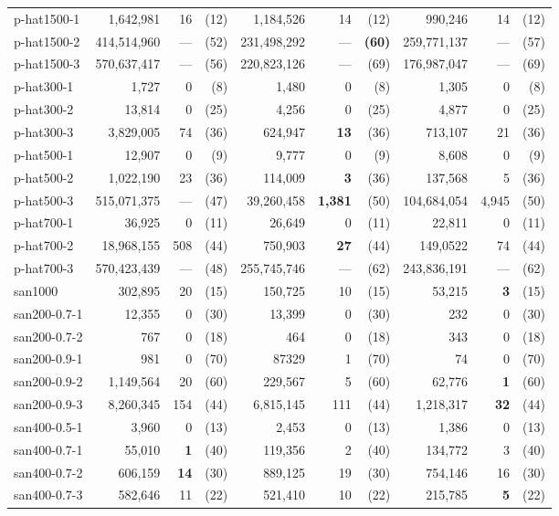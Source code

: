 \documentclass{l4proj}
\begin{document}
\begin{table}
\begin{center}
\begin{scriptsize}
\begin{tabular}{|l|r r r|r r r|r r r|}
p-hat1500-1 & 1,642,981 & 16 & (12) & 1,184,526 & 14 & (12) & 990,246 & 14 & (12) \\ 
p-hat1500-2 & 414,514,960 & --- & (52) & 231,498,292 & --- & \bf{(60)} & 259,771,137 & --- & (57) \\ 
p-hat1500-3 & 570,637,417 & --- & (56) & 220,823,126 & --- & (69) & 176,987,047 & --- & (69) \\ 
p-hat300-1 & 1,727 & 0 & (8) & 1,480 & 0 & (8) & 1,305 & 0 & (8) \\ 
p-hat300-2 & 13,814 & 0 & (25) & 4,256 & 0 & (25) & 4,877 & 0 & (25) \\ 
p-hat300-3 & 3,829,005 & 74 & (36) & 624,947 & \bf{13} & (36) & 713,107 & 21 & (36) \\ 
p-hat500-1 & 12,907 & 0 & (9) & 9,777 & 0 & (9) & 8,608 & 0 & (9) \\ 
p-hat500-2 & 1,022,190 & 23 & (36) & 114,009 & \bf{3} & (36) & 137,568 & 5 & (36) \\ 
p-hat500-3 & 515,071,375 & --- & (47) & 39,260,458 & \bf{1,381} & (50) & 104,684,054 & 4,945 & (50) \\ 
p-hat700-1 & 36,925 & 0 & (11) & 26,649 & 0 & (11) & 22,811 & 0 & (11) \\ 
p-hat700-2 & 18,968,155 & 508 & (44) & 750,903 & \bf{27} & (44) & 149,0522 & 74 & (44) \\ 
p-hat700-3 & 570,423,439 & --- & (48) & 255,745,746 & --- & (62) & 243,836,191 & --- & (62) \\ 
san1000 & 302,895 & 20 & (15) & 150,725 & 10 & (15) & 53,215 & \bf{3} & (15) \\ 
san200-0.7-1 & 12,355 & 0 & (30) & 13,399 & 0 & (30) & 232 & 0 & (30) \\ 
san200-0.7-2 & 767 & 0 & (18) & 464 & 0 & (18) & 343 & 0 & (18) \\ 
san200-0.9-1 & 981 & 0 & (70) & 87329 & 1 & (70) & 74 & 0 & (70) \\ 
san200-0.9-2 & 1,149,564 & 20 & (60) & 229,567 & 5 & (60) & 62,776 & \bf{1} & (60) \\ 
san200-0.9-3 & 8,260,345 & 154 & (44) & 6,815,145 & 111 & (44) & 1,218,317 & \bf{32} & (44) \\ 
san400-0.5-1 & 3,960 & 0 & (13) & 2,453 & 0 & (13) & 1,386 & 0 & (13) \\ 
san400-0.7-1 & 55,010 & \bf{1} & (40) & 119,356 & 2 & (40) & 134,772 & 3 & (40) \\ 
san400-0.7-2 & 606,159 & \bf{14} & (30) & 889,125 & 19 & (30) & 754,146 & 16 & (30) \\ 
san400-0.7-3 & 582,646 & 11 & (22) & 521,410 & 10 & (22) & 215,785 & \bf{5} & (22) \\ 

\end{tabular}
\end{scriptsize}
\end{center}
\end{table}
\end{document}
